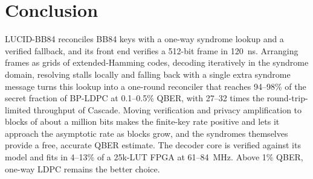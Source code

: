 \documentclass[conference]{IEEEtran}
\begin{document}
\section{Conclusion}\label{sec:conclusion}
LUCID-BB84 reconciles BB84 keys with a one-way syndrome lookup and a verified fallback, and its front end verifies a 512-bit frame in 120~ns. Arranging frames as grids of extended-Hamming codes, decoding iteratively in the syndrome domain, resolving stalls locally and falling back with a single extra syndrome message turns this lookup into a one-round reconciler that reaches 94--98\% of the secret fraction of BP-LDPC at 0.1--0.5\% QBER, with 27--32 times the round-trip-limited throughput of Cascade. Moving verification and privacy amplification to blocks of about a million bits makes the finite-key rate positive and lets it approach the asymptotic rate as blocks grow, and the syndromes themselves provide a free, accurate QBER estimate. The decoder core is verified against its model and fits in 4--13\% of a 25k-LUT FPGA at 61--84~MHz. Above 1\% QBER, one-way LDPC remains the better choice.



\end{document}
